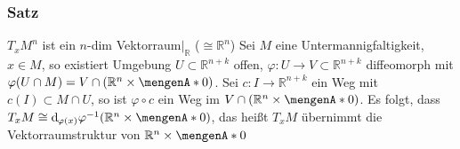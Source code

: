\subsubsection[Satz: Vektorraumstruktur des Tangentialraumes]{Satz}
\label{ssub:142}
$T_x M^n$ ist ein $n$-dim Vektorraum$\vert_{\mathds{R}}$ ($\cong \mathds{R}^n$)
Sei $M$ eine Untermannigfaltigkeit, $x\in M$, so existiert Umgebung $U\subset \mathds{R}^{n+k}$ offen, $\varphi:U\to V\subset \mathds{R}^{n+k}$ diffeomorph mit $\varphi(U\cap M) = V\cap(\mathds{R}^n\times \set{0})$. Sei $c: I\to \mathds{R}^{n+k}$ ein Weg mit $c(I)\subset M\cap U$, so ist $\varphi \circ c$ ein Weg im $V\cap(\mathds{R}^n\times \set{0})$. Es folgt, dass $T_x M \cong \mathd_{\varphi(x)} \varphi^{-1}(\mathds{R}^n\times \set{0})$, das heißt $T_x M$ übernimmt die Vektorraumstruktur von $\mathds{R}^n \times \set{0}$ 

